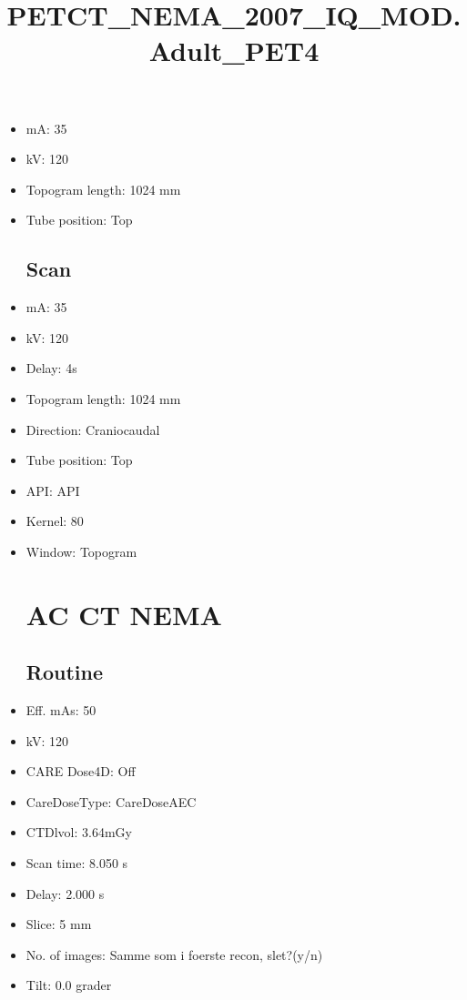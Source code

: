 \documentclass[12pt]{article}
\title{PETCT\_NEMA\_2007\_IQ\_MOD.Adult\_PET4}
\begin{document}
\maketitle
\newpage
\tableofcontents
\newpage
{}


\begin{itemize}\section{Topogram}
\subsection{Routine}
\item mA: 35\item kV: 120\item Topogram length: 1024 mm\item Tube position: Top
\subsection{Scan}\item mA: 35\item kV: 120\item Delay: 4s\item Topogram length: 1024 mm\item Direction: Craniocaudal\item Tube position: Top\item API: API \item Kernel: 80\item Window: Topogram
\section{AC CT NEMA}
\subsection{Routine}
\item Eff. mAs: 50\item kV: 120\item CARE Dose4D: Off\item CareDoseType: CareDoseAEC\item CTDlvol: 3.64mGy\item Scan time: 8.050 s\item Delay: 2.000 s\item Slice: 5 mm\item No. of images: Samme som i foerste recon, slet?(y/n)\item Tilt: 0.0 grader

\end{itemize}
\end{document}
